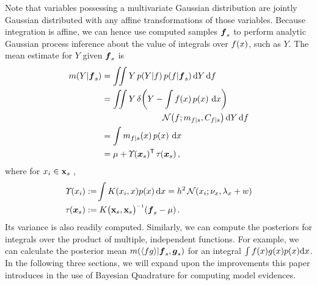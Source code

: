 \documentclass{article}
\begin{document}
Note that variables possessing a multivariate Gaussian distribution are jointly Gaussian distributed with any affine transformations of those variables. Because integration is affine, we can hence use computed samples $\vf_s$ to perform analytic Gaussian process inference about the value of integrals over $f(\lfv)$, such as $Y$. The mean estimate for $Y$ given $\vf_s$ is
%
\begin{align} \label{eq:mean_inty_f}
\mean{Y}{\vf_s}
& 
=\iint Y\,\p{Y}{f}\p{f}{\vf_s} \ud Y \,\ud f                                                                                                                                                               \nonumber\\
&
 =\iint Y\,\dd{Y}{\int f(\lfv)\,\po{\lfv}\,\ud\lfv}
\nonumber\\
&\hspace{2.5cm}
\N{f}{\meancondfn{f}{s}}{C_{f|s}} \ud Y \,\ud f \nonumber\\
&
 = \int \meancondfn{f}{s}(\lfv)\,\po{\lfv}\,\ud\lfv\nonumber\\
&
 = 
\mu + \ntT{s}{}\, \dtt{s}{}
\,,
\end{align}
where for $\lfv_i \in \vlfv_s$ \citep{BZMonteCarlo},
\begin{align}
\fnt{\lfv_i}{} & \deq \!\int K(\lfv_i,\lfv)\po{\lfv}\ud\lfv
 = h^2\,\N{\lfv_i}{\nu_{\lfv}}{\lambda_{\lfv}+w}\nonumber\\
\dtt{s}{} & \deq K\bigl(\vlfv_s,\vlfv_s\bigr)\inv (\vf_s-{\mu})\,.
\end{align}
%
%
Its variance is also readily computed. Similarly, we can compute the posteriors for integrals over the product of multiple, independent functions. For example, we can calculate the posterior mean 
$\mean{\inty{f g}}{\vf_s, \vect{g}_s}$ for an integral $\int f(x) g(x) p(x) \ud x$. 
 In the following three sections, we will expand upon the improvements this paper introduces in the use of Bayesian Quadrature for computing model evidences.
\end{document}
